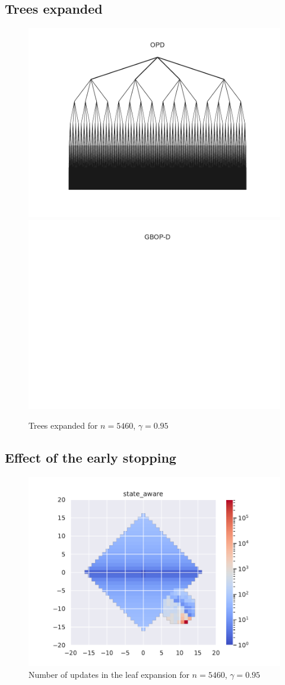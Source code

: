 \documentclass[runningheads]{llncs}
\begin{document}
\subsection{Trees expanded}
\begin{figure}[H]
	\centering
	\includegraphics[width=0.44\linewidth]{img/tree_OPD.pdf}
	\includegraphics[width=0.44\linewidth]{img/tree_GBOP-D.pdf}
	\caption{Trees expanded for $n = 5460$, $\gamma=0.95$}
	\label{fig:trees_expanded}
\end{figure}

\subsection{Effect of the early stopping}

\begin{figure}[H]
	\centering
	\includegraphics[width=0.44\linewidth]{img/updates_GBOP-D.pdf}
	\caption{Number of updates in the leaf expansion for $n = 5460$, $\gamma=0.95$}
	\label{fig:gw4_updates}
\end{figure}
\end{document}
